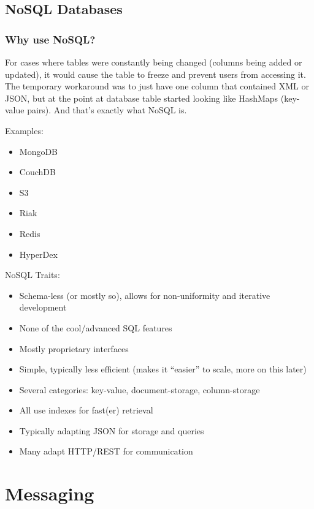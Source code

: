\documentclass[fancy,11pt,titlestyle=display]{style/elegantbook}
\begin{document}
\newpage
\section{NoSQL Databases}

\subsection{Why use NoSQL?}

\par For cases where tables were constantly being changed (columns being added or updated), it would cause the table to freeze and prevent users from accessing it. The temporary workaround was to just have one column that contained XML or JSON, but at the point at database table started looking like HashMaps (key-value pairs). And that's exactly what NoSQL is.

\par \noindent Examples:
\begin{itemize}
    \item MongoDB
    \item CouchDB
    \item S3
    \item Riak
    \item Redis
    \item HyperDex
\end{itemize}

\par \noindent NoSQL Traits:
\begin{itemize}
    \item Schema-less (or mostly so), allows for non-uniformity and iterative development
    \item None of the cool/advanced SQL features
    \item Mostly proprietary interfaces
    \item Simple, typically less efficient (makes it ``easier'' to scale, more on this later)
    \item Several categories: key-value, document-storage, column-storage
    \item All use indexes for fast(er) retrieval
    \item Typically adapting JSON for storage and queries
    \item Many adapt HTTP/REST for communication
\end{itemize}



\chapter{Messaging}
\end{document}
